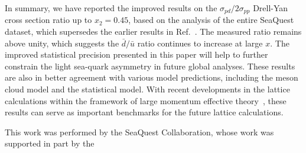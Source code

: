 \documentclass[reprint,aps,unsortedaddress,superscriptaddress,prl,floatfix,showpacs,linenumbers,final]{revtex4-2}
\begin{document}
In summary, we have reported the improved results on the $\sigma_{pd}/2\sigma_{pp}$ Drell-Yan cross section ratio up to $x_2=0.45$,
based on the analysis of the entire SeaQuest dataset, which supersedes the earlier results in Ref.~\cite{dove2021,dove2023}.
The measured ratio remains above unity, which suggests the $\bar{d}/\bar{u}$ ratio continues to increase at large $x$.
The improved statistical precision presented in this paper will help to further constrain the light sea-quark asymmetry in future global analyses.
These results are also in better agreement with various model predictions, including the meson cloud model and the statistical model.
With recent developments in the lattice calculations within the framework of large momentum effective theory~\cite{constantinou2021},
these results can serve as important benchmarks for the future lattice calculations.
\begin{acknowledgments}
	This work was performed by the SeaQuest Collaboration, whose work was supported in part by the
\end{acknowledgments}

\end{document}
